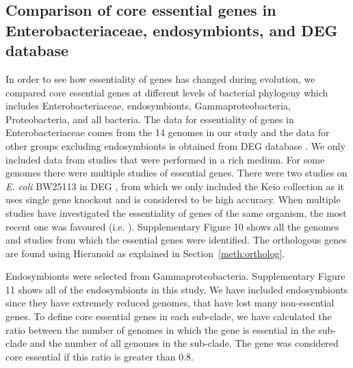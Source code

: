 \documentclass[12pt,letterpaper]{article}
\begin{document}
\subsection{Comparison of core essential genes in Enterobacteriaceae, endosymbionts, and DEG database}\label{meth:corecompare}
In order to see how essentiality of genes has changed during evolution, we compared core essential genes at different levels of bacterial phylogeny which includes Enterobacteriaceae, endosymbionts, Gammaproteobacteria, Proteobacteria, and all bacteria. The data for essentiality of genes in Enterobacteriaceae comes from the 14 genomes in our study and the data for other groups excluding endosymbionts is obtained from DEG database \cite{luo_deg_2014}. We only included data from studies that were performed in a rich medium. For some genomes there were multiple studies of essential genes. There were two studies on \textit{E. coli} BW25113 in DEG \cite{gerdes_experimental_2003, baba_construction_2006}, from which we only included the Keio collection \cite{baba_construction_2006} as it uses single gene knockout and is considered to be high accuracy. %
When multiple studies have investigated the essentiality of genes of the same organism, the most recent one was favoured (i.e. \cite{zhang_global_2012, hutcherson_comparison_2016, turner_essential_2015}). Supplementary Figure 10 shows all the genomes and studies from which the essential genes were identified. The orthologous genes are found using Hieranoid as explained in Section~\ref{meth:ortholog}.

Endosymbionts were selected from Gammaproteobacteria. Supplementary Figure 11 shows all of the endosymbionts in this study. We have included endosymbionts since they have extremely reduced genomes, that have lost many non-essential genes. To define core essential genes in each sub-clade, we have calculated the ratio between the number of genomes in which the gene is essential in the sub-clade and the number of all genomes in the sub-clade. The gene was considered core essential if this ratio is greater than 0.8.
\end{document}
